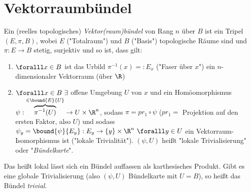 \chapter{Vektorraumbündel}\lecture 


\begin{defn}[Vektorraumbündel]
	Ein (reelles topologisches) \emph{Vektor(raum)bündel} von Rang $n$ über $B$ ist ein Tripel $(E,\pi,B)$, wobei $E$ ("Totalraum") und $B$ ("Basis") topologische Räume sind und $\pi: E \to B$ stetig, surjektiv und so ist, dass gilt:
	\begin{enumerate}[label={\roman*})]
		\item $\foralll x \in B$ ist das Urbild $\pi^{-1}(x) =: E_x$ ("Faser über $x$") ein $n$-dimensionaler Vektorraum (über $\R$)
		\item $\foralll x \in B \ \exists$ offene Umgebung $U$ von $x$ und ein Homöomorphismus $\psi: \overbrace{\pi^{-1} (U)}^{\in \bound{E}{U}} \to U \times \R^n$, sodass $\pi = pr_1 \circ \psi$ ($pr_1 =$ Projektion auf den ersten Faktor, also $U$) und sodass $\psi_y = \bound{\psi}{E_y} : E_y \to \{y\} \times \R^n \ \foralll y \in U$ ein Vektorraum-Isomorphismus ist ("lokale Trivialität"). $(\psi,U)$ heißt "lokale Trivialisierung" oder "\emph{Bündelkarte}".
	\end{enumerate}
\end{defn}

\begin{minipage}{\linewidth}
	\begin{wrapfigure}{R}{8cm}
		\centering
	\end{wrapfigure}

	Das heißt lokal lässt sich ein Bündel auffassen als karthesisches Produkt. Gibt es eine globale Trivialisierung (also $(\psi,U)$ Bündelkarte mit $U = B$), so heißt das Bündel \emph{trivial}.
\end{minipage}

